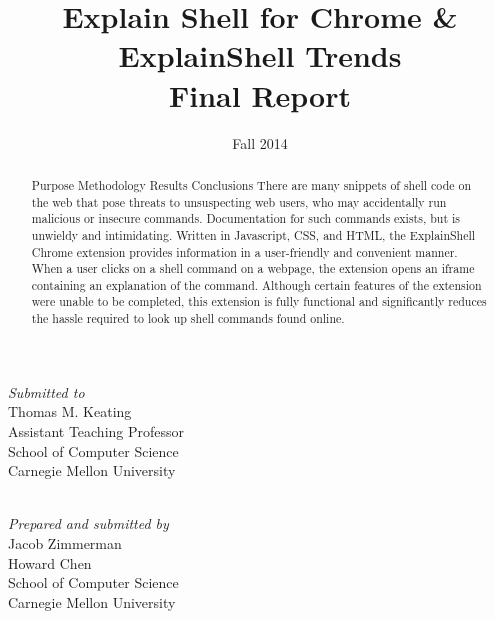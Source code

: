 \documentclass[11pt]{article}
\title{Explain Shell for Chrome \& ExplainShell Trends\\Final Report}
\author{}
\date{Fall 2014}
\begin{document}


\thispagestyle{empty}
\maketitle
\thispagestyle{empty}

\begin{center}
  \textit{Submitted to} \\
  Thomas M. Keating \\
  Assistant Teaching Professor \\
  School of Computer Science \\
  Carnegie Mellon University

  \mbox{} \\

  \textit{Prepared and submitted by} \\
  Jacob Zimmerman \\
  Howard Chen \\
  School of Computer Science \\
  Carnegie Mellon University

  \mbox{} \\
\end{center}

\begin{abstract}
  Purpose
  Methodology
  Results
  Conclusions
  There are many snippets of shell code on the web that pose threats to
  unsuspecting web users, who may accidentally run malicious or insecure
  commands. Documentation for such commands exists, but is unwieldy and
  intimidating. Written in Javascript, CSS, and HTML, the ExplainShell Chrome
  extension provides information in a user-friendly and convenient manner. When
  a user clicks on a shell command on a webpage, the extension opens an iframe
  containing an explanation of the command. Although certain features of the
  extension were unable to be completed, this extension is fully functional and
  significantly reduces the hassle required to look up shell commands found
  online.
\end{abstract}

\newpage

\tableofcontents

\newpage
\end{document}
